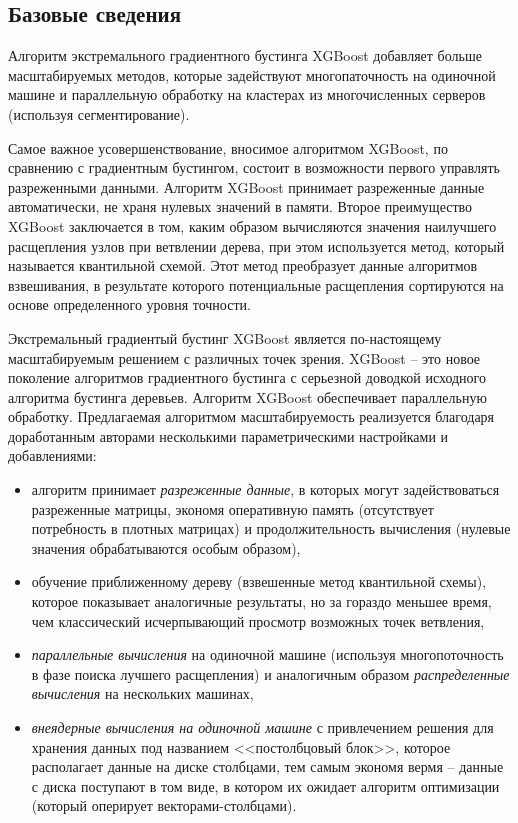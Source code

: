 \documentclass[%
	11pt,
	a4paper,
	utf8,
		]{article}
\begin{document}
\subsection{Базовые сведения}

Алгоритм экстремального градиентного бустинга XGBoost добавляет больше масштабируемых методов, которые задействуют многопаточность на одиночной машине и параллельную обработку на кластерах из многочисленных серверов (используя сегментирование).

Самое важное усовершенствование, вносимое алгоритмом XGBoost, по сравнению с градиентным бустингом, состоит в возможности первого управлять разреженными данными. Алгоритм XGBoost принимает разреженные данные автоматически, не храня нулевых значений в памяти. Второе преимущество XGBoost заключается в том, каким образом вычисляются значения наилучшего расщепления узлов при ветвлении дерева, при этом используется метод, который называется квантильной схемой. Этот метод преобразует данные алгоритмов взвешивания, в результате которого потенциальные расщепления сортируются на основе определенного уровня точности.

Экстремальный градиентый бустинг XGBoost является по-настоящему масштабируемым решением с различных точек зрения. XGBoost -- это новое поколение алгоритмов градиентного бустинга с серьезной доводкой исходного алгоритма бустинга деревьев. Алгоритм XGBoost обеспечивает параллельную обработку. Предлагаемая алгоритмом масштабируемость реализуется благодаря доработанным авторами несколькими параметрическими настройками и добавлениями:
\begin{itemize}
	\item алгоритм принимает \emph{разреженные данные}, в которых могут задействоваться разреженные матрицы, экономя оперативную память (отсутствует потребность в плотных матрицах) и продолжительность вычисления (нулевые значения обрабатываются особым образом),
	
	\item обучение приближенному дереву (взвешенные метод квантильной схемы), которое показывает аналогичные результаты, но за гораздо меньшее время, чем классический исчерпывающий просмотр возможных точек ветвления,
	
	\item \emph{параллельные вычисления} на одиночной машине (используя многопоточность в фазе поиска лучшего расщепления) и аналогичным образом \emph{распределенные вычисления} на нескольких машинах,
	
	\item \emph{внеядерные вычисления на одиночной машине} с привлечением решения для хранения данных под названием <<постолбцовый блок>>, которое располагает данные на диске столбцами, тем самым экономя вермя -- данные с диска поступают в том виде, в котором их ожидает алгоритм оптимизации (который оперирует векторами-столбцами).
\end{itemize} 
\end{document}
